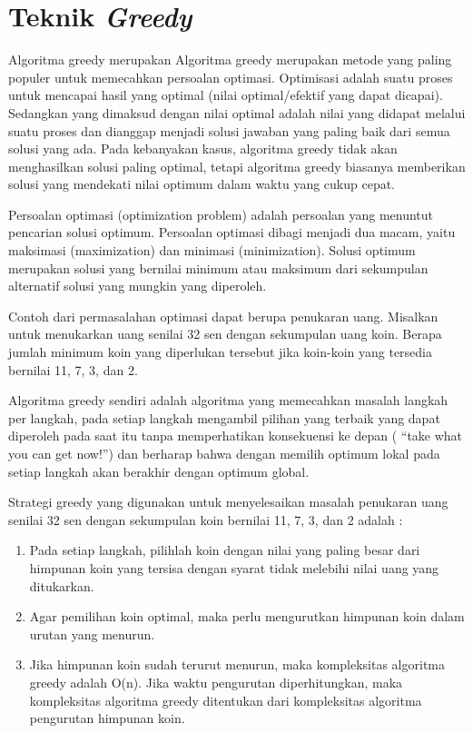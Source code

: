\chapter{Teknik \textit{Greedy}}

Algoritma greedy merupakan Algoritma greedy merupakan metode yang paling populer untuk memecahkan persoalan optimasi. Optimisasi adalah suatu proses untuk mencapai hasil yang optimal (nilai optimal/efektif yang dapat dicapai). Sedangkan yang dimaksud dengan nilai optimal adalah nilai yang didapat melalui suatu  proses dan dianggap menjadi solusi jawaban yang paling baik dari semua solusi yang ada. Pada kebanyakan kasus, algoritma greedy tidak akan menghasilkan solusi paling optimal, tetapi algoritma greedy biasanya memberikan solusi yang mendekati nilai optimum dalam waktu yang cukup cepat. 

Persoalan optimasi (optimization problem) adalah persoalan yang menuntut pencarian solusi optimum. Persoalan optimasi dibagi menjadi dua macam, yaitu maksimasi (maximization) dan minimasi (minimization). Solusi optimum merupakan solusi yang bernilai minimum atau maksimum dari sekumpulan alternatif solusi yang mungkin yang diperoleh. 

Contoh dari permasalahan optimasi dapat berupa penukaran uang. Misalkan untuk menukarkan uang senilai 32 sen dengan sekumpulan uang koin. Berapa jumlah minimum koin yang diperlukan tersebut jika koin-koin yang tersedia bernilai 11, 7, 3, dan 2. 

Algoritma greedy sendiri adalah algoritma yang memecahkan masalah langkah per langkah, pada setiap langkah mengambil pilihan yang terbaik yang dapat diperoleh pada saat itu tanpa memperhatikan konsekuensi ke depan ( \textquotedblleft take what you can get now!\textquotedblright ) dan	berharap bahwa dengan memilih optimum lokal pada setiap langkah akan berakhir dengan optimum global.

Strategi greedy yang digunakan untuk menyelesaikan masalah penukaran uang senilai 32 sen dengan sekumpulan koin bernilai 11, 7, 3, dan 2 adalah :

\begin{enumerate}
\item Pada setiap langkah, pilihlah koin dengan nilai yang paling besar dari himpunan koin yang tersisa dengan syarat tidak melebihi nilai uang yang ditukarkan.
\item	Agar pemilihan koin optimal, maka perlu mengurutkan himpunan koin dalam urutan yang menurun. 
\item	Jika himpunan koin sudah terurut menurun, maka kompleksitas algoritma greedy adalah O(n). Jika waktu pengurutan diperhitungkan, maka kompleksitas algoritma greedy ditentukan dari kompleksitas algoritma pengurutan himpunan koin. 

\end{enumerate}

